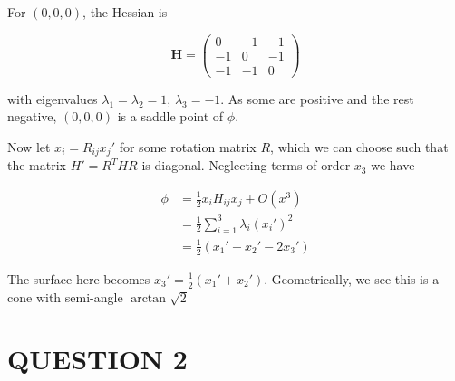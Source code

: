 \documentclass[a4paper]{article}
\begin{document}
For $ (0,0,0) $, the Hessian is 

\[ \mathbf{H} = \begin{pmatrix}
0 & -1 & -1 \\
-1 & 0 & -1 \\
-1 & -1 & 0 
\end{pmatrix} \]

with eigenvalues $ \lambda_{1} = \lambda_{2} = 1 $, $ \lambda_{3} = -1 $. As some are positive and the rest negative, $ (0,0,0) $ is a saddle point of $ \phi $.

Now let $ x_{i} = R_{ij} x_{j}' $ for some rotation matrix $ R $, which we can choose such that the matrix $ H' = R^{T} H R $ is diagonal. Neglecting terms of order $ x_{3} $ we have

\begin{align*}
\phi & = \frac{1}{2} x_{i} H_{ij} x_{j} + O(x^{3})\\
& = \frac{1}{2}\sum_{i = 1 }^{3} \lambda_{i} (x_{i}')^{2} \\
& = \frac{1}{2}\left( x_{1}' + x_{2}' - 2x_{3}' \right)  
\end{align*}

The surface here becomes $ x_{3}' = \frac{1}{2} (x_{1}' + x_{2}') $. Geometrically, we see this is a cone with semi-angle $ \arctan \sqrt{2} $



\section{QUESTION 2}
\end{document}
